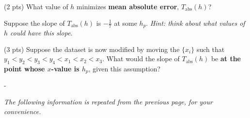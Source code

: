 \documentclass[twoside,12pt]{article}
\newcommand{\suraj}[1]{{\color{blue}[{\bf Suraj}: #1]}}
\begin{document}
\begin{probset}
\begin{prob}
\begin{subprobset}
\begin{subprob}
            
            
            
        \end{subprob}

        \begin{subprob}(2 pts)
            What value of $h$ minimizes \textbf{mean absolute error}, $T_\text{abs}(h)$?
            
            \bubble{$-\infty$}
            

            
            
            
            \bubble{$\infty$}
            
        \end{subprob}

        \vspace{1em}


\end{subprobset}        

        
        Suppose the slope of $T_\text{abs}(h)$ is $-\frac{1}{7}$ at some $h_p$. \textit{Hint: think about what values of $h$ could have this slope.}
\begin{subprobset}
        \begin{subprob}(3 pts)
        Suppose the dataset is now modified by moving the $\{x_i\}$ such that \\  $y_1 < y_2 < y_3 < y_4 < x_1 < x_2 < x_3$. 
        What would the slope of $T_\text{abs}(h)$ be \textbf{at the point whose $x$-value is $h_p$}, given this assumption?

        \begin{responsebox}{0.5in}
            -
        \end{responsebox}
            \end{subprob}


\end{subprobset}
\newpage
    \textit{The following information is repeated from the previous page, for your convenience.} 
    

\end{prob}
\end{probset}
\end{document}
